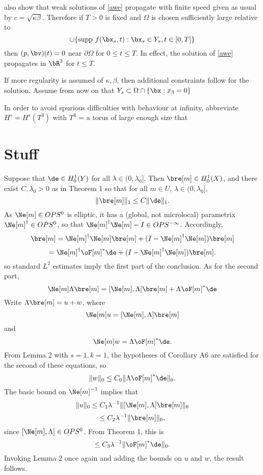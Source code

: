 \cite{BlazekStolkSymes:13} also show that weak solutions of
\eqref{awe} propagate with finite speed given as usual by $c =
\sqrt{\kappa \beta}$. Therefore if $T > 0$ is fixed and $\Omega$ is chosen sufficiently
large relative to 
\[
\cup \{\mbox{supp } f(\bx_s,t): \bx_s \in Y_s, t \in [0,T]\}
\]
then $(p,\bv)(t) = 0$ near $\partial \Omega$ for $0\le t \le T$. In
effect, the solution of \eqref{awe} propagates in $\bR^3$ for $ t \le
T$.

If more regularity is assumed of $\kappa, \beta$, then additional
constraints follow for the solution. Assume from now on that $Y_s
\subset \Omega \cap \{\bx:x_3=0 \}$

In order to avoid spurious difficulties with behaviour at infinity,
abbreviate $H^s = H^s(T^3)$ with $T^3$ = a torus of large enough size
that   



\section{Stuff}

 Suppose that  $\de \in H^1_0(Y)$ for all $\lambda \in (0,\lambda_0]$. Then $\bre[m] \in H^1_0(X)$, and there exist $C,\lambda_0>0$ as in Theorem 1 so that for all $m \in U$, $\lambda \in (0,\lambda_0]$,
\[
\|\bre[m]\|_1 \le C \|\de\|_1.
\]
As $\Ne[m] \in OPS^0$ is elliptic, it has a (global, not microlocal) parametrix $\Ne[m]^{\dagger} \in OPS^0$, so that $\Ne[m]^{\dagger}\Ne[m]-I \in OPS^{-\infty}$. Accordingly,
\[
\bre[m] = \Ne[m]^{\dagger}\Ne[m]\bre[m] + (I-\Ne[m]^{\dagger}\Ne[m])\bre[m]
\]
\[
= \Ne[m]^{\dagger}\oF[m]^*\de + (I-\Ne[m]^{\dagger}\Ne[m])\bre[m].
\]
so standard $L^2$ estimates imply the first part of the conclusion. As for the second part,
\[
\Ne[m]\Lambda\bre[m] = [\Ne[m],\Lambda]\bre[m]+\Lambda\oF[m]^*\de
\]
Write $\Lambda \bre[m]=u+w$, where
\[
\Ne[m]u = [\Ne[m],\Lambda]\bre[m]
\]
and
\[
\Ne[m]w=\Lambda \oF[m]^*\de.
\]
From Lemma 2 with $s=1, k=1$, the hypotheses of Corollary A6 are satisfied for the second of these equations, so
\[
\|w\|_0 \le C_0 \|\Lambda \oF[m]^*\de\|_{0}.
\]
The basic bound on $\Ne[m]^{-1}$ implies that
\[
\|u\|_0 \le C_1 \lambda^{-1}\|[\Ne[m],\Lambda]\bre[m]\|_0
\]
\[
\le C_2 \lambda^{-1}\|\bre[m]\|_0,
\]
since $[\Ne[m],\Lambda] \in OPS^{0}$.  From Theorem 1, this is
\[
\le C_3 \lambda^{-1}\|\oF[m]^*\de\|_{0}.
\]
Invoking Lemma 2 once again and adding the bounds on $u$ and $w$, the result follows.

